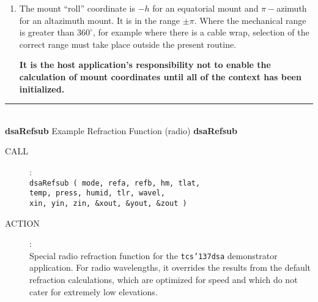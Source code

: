 \documentclass[12pt,fleqn,twoside]{article}
\renewcommand{\_}{{\tt\char'137}}     %
\newcommand{\routine}[2]
{
  \newpage
  \rule{\textwidth}{0.3mm}\\ \nopagebreak
  {\Large {\bf #1} \hfill #2 \hfill {\bf #1}}
  \vspace{-1ex}
}
\newcommand{\call}[1]
{
  \goodbreak
  \begin{description}
    \item[CALL]: \\[0.5ex] \nopagebreak
        {\tt #1}
  \end{description}
  \vspace{-3ex}
}
\newcommand{\action}[1]
{
  \goodbreak
  \begin{description}
    \item[ACTION]: \\[0.5ex] \nopagebreak
        #1
  \end{description}
  \vspace{-3ex}
}
\begin{document}
{\begin{enumerate}
      Regarding the servo controller software, note the following:
      \begin{itemize}
      \item Although all components of the system need reasonably accurate
            time, only the servo controller itself needs the exact time.
      \item It is important that the earliest of the samples being used
            for the interpolation lies {\it before}\/ the time for which the
            trajectory calculation is being carried out.  If this condition
            is not met, so that both (or all) of the samples lie in the
            future, any step in the demand will for a while be extrapolated
            backwards, producing a spurious initial jump in the wrong
            direction.  Measures must be taken avoid this condition.  The
            most complete method is to retain all of the samples, no matter
            how far into the future they extend, until they are no longer
            required.  A cruder approach is to continue to use the same
            ``earliest'' sample until a replacement arrives that predates the
            current time, simply discarding any potential replacements that
            are for later than the current time.
      \end{itemize}
      See also Section~\ref{glitch}, p\pageref{glitch}.
\item The mount ``roll'' coordinate is $-h$ for an equatorial mount and
      $\pi-$azimuth for an altazimuth mount.  It is in the range
      $\pm\pi$.  Where
      the mechanical range is greater than $360^\circ$, for example where
      there is a cable wrap, selection of the correct range must take
      place outside the present routine.

      {\bf It is the host application's responsibility not to
           enable the calculation of mount coordinates until
           all of the context has been initialized.}
\end{enumerate}
}
\routine{dsaRefsub}{Example Refraction Function (radio)}
\label{dsaRefsub}
\call{dsaRefsub ( mode, refa, refb, hm, tlat, \\
 \hspace*{13.2ex} temp, press, humid, tlr, wavel, \\
 \hspace*{13.2ex} xin, yin, zin, \&xout, \&yout, \&zout ) }
\action{Special radio refraction function for the
        {\tt tcs\_dsa} demonstrator application.  For
        radio wavelengths, it overrides the results from the default
        refraction calculations, which are optimized for speed and which
        do not cater for extremely low elevations.}
\end{document}
